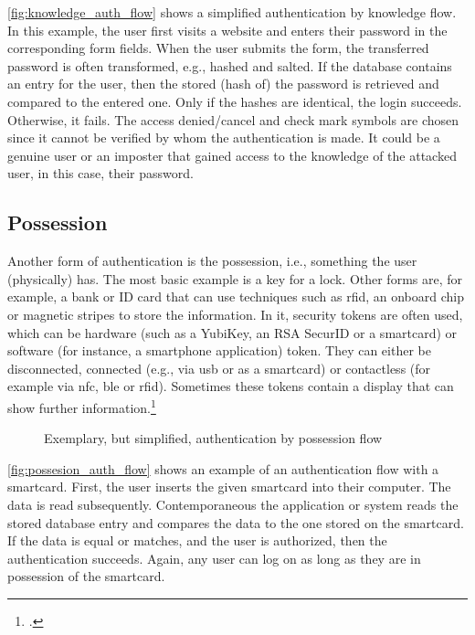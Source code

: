 \autoref{fig:knowledge_auth_flow} shows a simplified authentication by knowledge flow. In this example, the user first visits a website and enters their password in the corresponding form fields. When the user submits the form, the transferred password is often transformed, e.g., hashed and salted. If the database contains an entry for the user, then the stored (hash of) the password is retrieved and compared to the entered one. Only if the hashes are identical, the login succeeds. Otherwise, it fails. The \frqq access denied/cancel\flqq{} and \frqq check mark\flqq{} symbols are chosen since it cannot be verified by whom the authentication is made. It could be a genuine user or an imposter that gained access to the knowledge of the attacked user, in this case, their password.

\subsection{Possession}

Another form of authentication is the possession, i.e., \frqq something the user (physically) has\flqq{}. The most basic example is a key for a lock. Other forms are, for example, a bank or ID card that can use techniques such as \gls{rfid}, an onboard chip or magnetic stripes to store the information. In \gls{it}, security tokens are often used, which can be hardware (such as a YubiKey, an RSA SecurID or a smartcard) or software (for instance, a smartphone application) token. They can either be disconnected, connected (e.g., via \gls{usb} or as a smartcard) or contactless (for example via \gls{nfc}, \gls{ble} or \gls{rfid}). Sometimes these tokens contain a display that can show further information.\footcites[See][24]{265831}[See][]{Dressel:2019:SZT:3319499.3328225}[See][8--11]{Mayes2017}

\begin{figure}[hbt]
	\centering
	
	\caption[Exemplary, but simplified, authentication by possession flow]{Exemplary, but simplified, authentication by possession flow\footnotemark}
	\label{fig:possesion_auth_flow}
\end{figure}

\autoref{fig:possesion_auth_flow} shows an example of an authentication flow with a smartcard. First, the user inserts the given smartcard into their computer. The data is read subsequently. Contemporaneous the application or system reads the stored database entry and compares the data to the one stored on the smartcard. If the data is equal or matches, and the user is authorized, then the authentication succeeds. Again, any user can log on as long as they are in possession of the smartcard.

